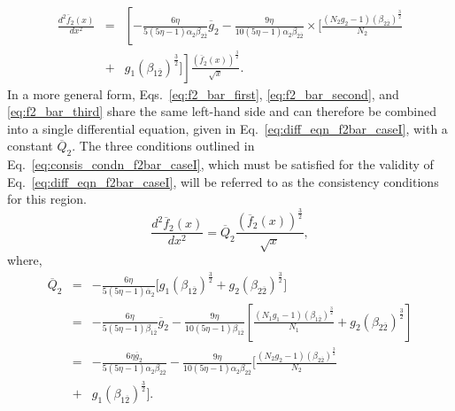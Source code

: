 \documentclass[preprint,12pt]{elsarticle}
\begin{document}
            \begin{eqnarray}
                  \frac{d^2 \overline{f}_{2}(x)}{dx^2} &=& \left[-\frac{6\eta}{5(5\eta-1) \alpha_2 \beta_{2\overline{2}}}    \overline{g}_{2} 
                  - \frac{9\eta}{10(5\eta-1) \alpha_2 \beta_{2\overline{2}}}
                  \times \biggl[\frac{(N_2 g_2-1)(\beta_{2\overline{2}})^\frac{3}{2}}{N_2} \right. \nonumber \\ 
                  &+& \left. g_1 (\beta_{1\overline{2}})^\frac{3}{2}\biggr]\right]
                  \frac{\left( \overline{f}_{2}(x) \right)^\frac{3}{2}}{\sqrt{x}}.
                \label{eq:f2_bar_third}
            \end{eqnarray}
            In a more general form, Eqs.~\eqref{eq:f2_bar_first}, \eqref{eq:f2_bar_second}, and \eqref{eq:f2_bar_third} share the same left-hand side and can therefore be combined into a single differential equation, given in Eq.~\eqref{eq:diff_eqn_f2bar_caseI}, with a constant $\overline{Q}_{2}$. The three conditions outlined in Eq.~\eqref{eq:consis_condn_f2bar_caseI}, which must be satisfied for the validity of Eq.~\eqref{eq:diff_eqn_f2bar_caseI}, will be referred to as the consistency conditions for this region.
            \begin{equation}
                   \frac{d^2\overline{f}_{2}(x)}{dx^2} = \overline{Q}_{2} \frac{\left(\overline{f}_{2}(x)\right)^\frac{3}{2}}{\sqrt{x}},
                    \label{eq:diff_eqn_f2bar_caseI}
            \end{equation}
            where,  
            \begin{eqnarray}
                \overline{Q}_{2} &=& 
                    -\frac{6\eta}{5(5\eta-1) \overline{\alpha}_2} \biggl[ g_1 (\beta_{1\overline{2}})^\frac{3}{2} + g_2 (\beta_{2\overline{2}})^\frac{3}{2}
                    \biggr] \nonumber \\
                    &=& - \frac{6 \eta}{5 (5 \eta -1) \beta_{1\overline{2}}}\overline{g}_{2} -\frac{9\eta}{10(5\eta-1)\beta_{1\overline{2}}} 
                    \left[\frac{(N_1 g_1-1)(\beta_{1\overline{2}})^\frac{3}{2}}{N_1} + g_2 (\beta_{2\overline{2}})^\frac{3}{2} \right] \nonumber \\
                   &=& -\frac{6\eta \overline{g}_{2}}{5(5\eta-1) \alpha_2 \beta_{2\overline{2}}} - \frac{9\eta}{10(5\eta-1) \alpha_2 \beta_{2\overline{2}}}
                   \biggl[\frac{(N_2 g_2-1)(\beta_{2\overline{2}})^\frac{3}{2}}{N_2}\nonumber \\ 
                   &+& g_1 (\beta_{1\overline{2}})^\frac{3}{2}\biggr].
                \label{eq:consis_condn_f2bar_caseI}
            \end{eqnarray}
            
\end{document}
